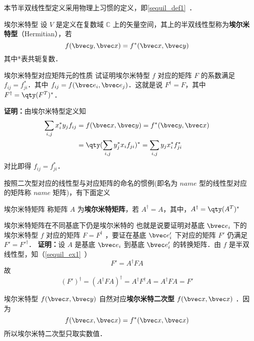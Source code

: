 本节半双线性型定义采用物理上习惯的定义，即\autoref{sequil_def1}~．
\begin{definition}{埃尔米特型}
设 $V$ 是定义在复数域 $\mathbb{C}$ 上的矢量空间，其上的半双线性型称为\textbf{埃尔米特型}（Hermitian），若
\begin{equation}\label{HeFor_eq2}
f(\bvec y,\bvec x)=f^*(\bvec x,\bvec y)
\end{equation}
其中*表共轭复数．
\end{definition}
\begin{example}{埃尔米特型对应矩阵元的性质}
试证明埃尔米特型 $f$ 对应的矩阵 $F$ 的系数满足 $f_{ij}=f_{ji}^*$．其中 $f_{ij}=f(\bvec e_i,\bvec e_j)$．这就是说 $F^\dagger=F$，其中 $F^\dagger=\qty(F^T)^*$．

\textbf{证明：}由埃尔米特型定义知
\begin{equation}
\begin{aligned}
\sum_{i,j}x_i^*y_j f_{ij}&=f(\bvec x,\bvec y)=f^*(\bvec y,\bvec x)\\
&=\qty(\sum_{i,j}y_j^* x_i f_{ji})^*=\sum_{i,j}y_j x_i^*f_{ji}^*
\end{aligned}
\end{equation}
对比即得 $f_{ij}=f_{ji}^*$．
\end{example}
按照二次型对应的线性型与对应矩阵的命名的惯例(即名为 $name$ 型的线性型对应的矩阵称 $name$ 矩阵)，有下面定义
\begin{definition}{埃尔米特矩阵}
称矩阵 $A$ 为\textbf{埃尔米特矩阵}，若 $A^\dagger=A$，其中，$A^\dagger=\qty(A^T)^*$
\end{definition}
\begin{example}{埃尔米特矩阵在不同基底下仍是埃尔米特的}
也就是说要证明对基底 $\bvec e_i$ 下的埃尔米特型 $f$ 对应的矩阵 $F=F^\dagger$ ，要证在基底 $\bvec e'_i$ 下对应的矩阵 $F'$ 仍满足 $F'=F'^\dagger$．
\textbf{证明：}设 $A$ 是基底 $\bvec e_i$ 到基底 $\bvec e'_i$ 的转换矩阵．由 $f$ 是半双线性型，知（\autoref{sequil_ex1}~）
\begin{equation}
F'=A^\dagger FA
\end{equation}
 故
\begin{equation}
(F')^\dagger=(A^\dagger FA)^\dagger=A^\dagger F^\dagger A=A^\dagger FA=F'
\end{equation}
\end{example}
埃尔米特型 $f(\bvec x,\bvec y)$ 自然对应\textbf{埃尔米特二次型} $f(\bvec x,\bvec x)$ ．因为
\begin{equation}
 f(\bvec x,\bvec x)= f^*(\bvec x,\bvec x) 
\end{equation}
所以埃尔米特二次型只取实数值．

